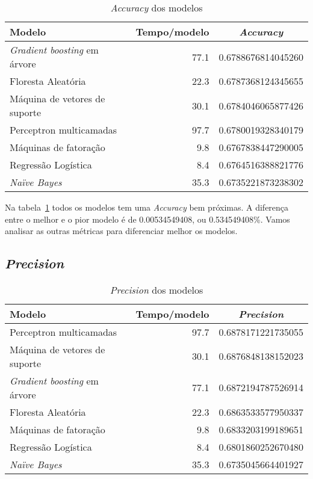 \begin{table}[h]
    \centering
    \begin{tabular}{|l|r|c|}
        \hline
        Modelo                               & Tempo/modelo & \textit{Accuracy}  \\
        \hline
        \textit{Gradient boosting} em árvore & 77.1         & 0.6788676814045260 \\
        Floresta Aleatória                   & 22.3         & 0.6787368124345655 \\
        Máquina de vetores de suporte        & 30.1         & 0.6784046065877426 \\
        Perceptron multicamadas              & 97.7         & 0.6780019328340179 \\
        Máquinas de fatoração                & 9.8          & 0.6767838447290005 \\
        Regressão Logística                  & 8.4          & 0.6764516388821776 \\
        \textit{Naïve Bayes}                 & 35.3         & 0.6735221873238302 \\
        \hline
    \end{tabular}
    \caption{\textit{Accuracy} dos modelos}
    \label{tab:modelos-accuracy}
\end{table}

Na tabela~\ref{tab:modelos-accuracy} todos os modelos tem uma \textit{Accuracy} bem próximas.
A diferença entre o melhor e o pior modelo é de 0.00534549408, ou 0.534549408\%.
Vamos analisar as outras métricas para diferenciar melhor os modelos.

\subsection{\textit{Precision}}
\label{subsec:precision}

\begin{table}[h]
    \centering
    \begin{tabular}{|l|r|c|}
        \hline
        Modelo                               & Tempo/modelo & \textit{Precision} \\
        \hline
        Perceptron multicamadas              & 97.7         & 0.6878171221735055 \\
        Máquina de vetores de suporte        & 30.1         & 0.6876848138152023 \\
        \textit{Gradient boosting} em árvore & 77.1         & 0.6872194787526914 \\
        Floresta Aleatória                   & 22.3         & 0.6863533577950337 \\
        Máquinas de fatoração                & 9.8          & 0.6833203199189651 \\
        Regressão Logística                  & 8.4          & 0.6801860252670480 \\
        \textit{Naïve Bayes}                 & 35.3         & 0.6735045664401927 \\
        \hline
    \end{tabular}
    \caption{\textit{Precision} dos modelos}
    \label{tab:modelos-precision}
\end{table}

